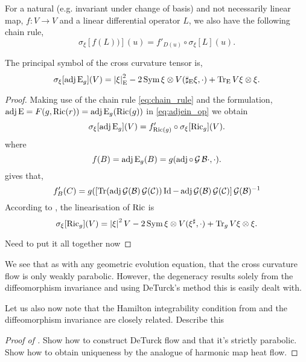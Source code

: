 \documentclass[a4paper, 12pt]{amsart}
\begin{document}
For a natural (e.g. invariant under change of basis) and not necessarily linear map, \(f : V \to V\) and a linear differential operator \(L\), we also have the following chain rule,
\begin{equation}
\label{eq:chain_rule}
\sigma_{\xi} [f(L))] (u) = f'_{D(u)} \circ \sigma_{\xi}[L] (u).
\end{equation}

\begin{lemma}
\label{lem:xcf_symbol}

The principal symbol of the cross curvature tensor is,
\[
\sigma_{\xi} [\operatorname{adj}\operatorname{E}_g] (V) = \left\lvert{\xi}\right\rvert^2_{\operatorname{E}} - 2 \operatorname{Sym} \xi \otimes V(\sharp_{\operatorname{E}}\xi, \cdot) + \operatorname{Tr}_{\operatorname{E}} V \xi \otimes \xi.
\]
\end{lemma}

\begin{proof}
Making use of the chain rule \eqref{eq:chain_rule} and the formulation, \(\operatorname{adj}\operatorname{E} = F(g, \operatorname{Ric}(r)) = \operatorname{adj}\operatorname{E}_g(\operatorname{Ric}(g))\) in \eqref{eq:adjein_op} we obtain
\[
\sigma_{\xi} [\operatorname{adj}\operatorname{E}_g] (V) = f'_{\operatorname{Ric}(g)} \circ \sigma_{\xi} [\operatorname{Ric}_g] (V).
\]
where
\[
f(B) = \operatorname{adj}\operatorname{E}_g (B) = g(\operatorname{adj} \circ \operatorname{\mathcal{G}} \mathcal{B} \cdot, \cdot).
\]
 gives that,
\[
f'_B (C) = g(\left[\operatorname{Tr}(\operatorname{adj}\operatorname{\mathcal{G}}(\mathcal{B}) \operatorname{\mathcal{G}}(\mathcal{C}))\operatorname{Id} - \operatorname{adj}\operatorname{\mathcal{G}}(\mathcal{B}) \operatorname{\mathcal{G}}(\mathcal{C})\right] \operatorname{\mathcal{G}}(\mathcal{B})^{-1}
\]
According to \cite[Section 5.1]{MR2265040}, the linearisation of \(\operatorname{Ric}\) is
\[
\sigma_{\xi} [\operatorname{Ric}_g] (V) = \left\lvert{\xi}\right\rvert^2 V - 2 \operatorname{Sym} \xi \otimes V(\xi^{\sharp}, \cdot) + \operatorname{Tr}_g V \xi \otimes \xi.
\]

{\color{red} Need to put it all together now}
\end{proof}

\begin{rem}
\label{rem:invariance_integrability}

We see that as with any geometric evolution equation, that the cross curvature flow is only weakly parabolic. However, the degeneracy results solely from the diffeomorphism invariance and using DeTurck's method this is easily dealt with.

Let us also now note that the Hamilton integrability condition from  and the diffeomorphism invariance are closely related. {\color{red} Describe this}
\end{rem}

\begin{proof}[Proof of ]

{\color{red} Show how to construct DeTurck flow and that it's strictly parabolic. Show how to obtain uniqueness by the analogue of harmonic map heat flow.}
\end{proof}
\end{document}
